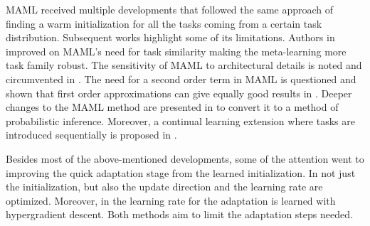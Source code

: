 
MAML received multiple developments that followed the same approach of finding a warm initialization for all the tasks coming from a certain task distribution. Subsequent works highlight some of its limitations. Authors in \cite{flennerhag2019,collins2020} improved on MAML's need for task similarity making the meta-learning more task family robust. The sensitivity of MAML to architectural details is noted and circumvented in \cite{antoniou2019}. The need for a second order term in MAML is questioned and shown that first order approximations can give equally good results in \cite{nichol2018}. Deeper changes to the MAML method are presented in \cite{grant2018} to convert it to a method of probabilistic inference. Moreover, a continual learning extension where tasks are introduced sequentially is proposed in \cite{finn2019,rajasegaran2020}. 

Besides most of the above-mentioned developments, some of the attention went to improving the quick adaptation stage from the learned initialization. In \cite{li2017} not just the initialization, but also the update direction and the learning rate are optimized. Moreover, in \cite{behl2019} the learning rate for the adaptation is learned with hypergradient descent. Both methods aim to limit the adaptation steps needed. 

